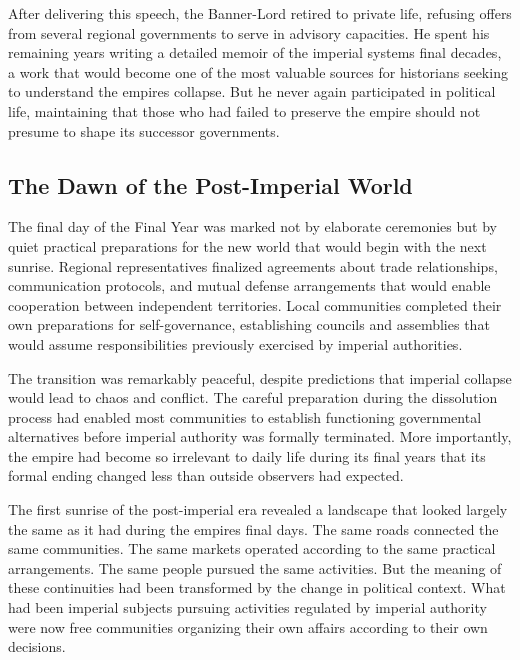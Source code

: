 After delivering this speech, the Banner-Lord retired to private life,
refusing offers from several regional governments to serve in advisory
capacities. He spent his remaining years writing a detailed memoir of
the imperial system\textquotesingle s final decades, a work that would
become one of the most valuable sources for historians seeking to
understand the empire\textquotesingle s collapse. But he never again
participated in political life, maintaining that those who had failed to
preserve the empire should not presume to shape its successor
governments.

\subsection{The Dawn of the Post-Imperial
World}\label{the-dawn-of-the-post-imperial-world}

The final day of the Final Year was marked not by elaborate ceremonies
but by quiet practical preparations for the new world that would begin
with the next sunrise. Regional representatives finalized agreements
about trade relationships, communication protocols, and mutual defense
arrangements that would enable cooperation between independent
territories. Local communities completed their own preparations for
self-governance, establishing councils and assemblies that would assume
responsibilities previously exercised by imperial authorities.

The transition was remarkably peaceful, despite predictions that
imperial collapse would lead to chaos and conflict. The careful
preparation during the dissolution process had enabled most communities
to establish functioning governmental alternatives before imperial
authority was formally terminated. More importantly, the empire had
become so irrelevant to daily life during its final years that its
formal ending changed less than outside observers had expected.

The first sunrise of the post-imperial era revealed a landscape that
looked largely the same as it had during the empire\textquotesingle s
final days. The same roads connected the same communities. The same
markets operated according to the same practical arrangements. The same
people pursued the same activities. But the meaning of these
continuities had been transformed by the change in political context.
What had been imperial subjects pursuing activities regulated by
imperial authority were now free communities organizing their own
affairs according to their own decisions.

